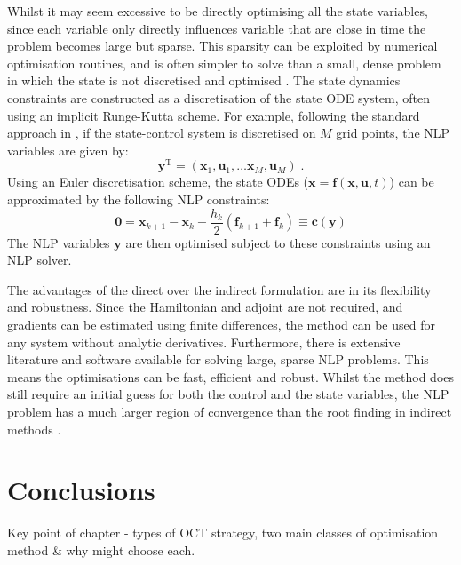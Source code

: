 Whilst it may seem excessive to be directly optimising all the state variables, since each variable only directly influences variable that are close in time the problem becomes large but sparse. This sparsity can be exploited by numerical optimisation routines, and is often simpler to solve than a small, dense problem in which the state is not discretised and optimised \citep{betts_practical_2010}. The state dynamics constraints are constructed as a discretisation of the state ODE system, often using an implicit Runge-Kutta scheme. For example, following the standard approach in \citet{betts_practical_2010}, if the state-control system is discretised on $M$ grid points, the NLP variables are given by:
\begin{equation}
    \bm{y}^\mathrm{T} = \left(\bm{x}_1, \bm{u}_1, \ldots \bm{x}_M, \bm{u}_M\right)\;.
\end{equation}
Using an Euler discretisation scheme, the state ODEs ($\dot{\bm{x}} = \bm{f}(\bm{x}, \bm{u}, t)$) can be approximated by the following NLP constraints:
\begin{equation}
    \bm{0} = \bm{x}_{k+1} - \bm{x}_k - \frac{h_k}{2}\left(\bm{f}_{k+1} + \bm{f}_k\right) \equiv \bm{c}(\bm{y})
\end{equation}
The NLP variables $\bm{y}$ are then optimised subject to these constraints using an NLP solver.

The advantages of the direct over the indirect formulation are in its flexibility and robustness. Since the Hamiltonian and adjoint are not required, and gradients can be estimated using finite differences, the method can be used for any system without analytic derivatives. Furthermore, there is extensive literature and software available for solving large, sparse NLP problems. This means the optimisations can be fast, efficient and robust. Whilst the method does still require an initial guess for both the control and the state variables, the NLP problem has a much larger region of convergence than the root finding in indirect methods \citep{betts_practical_2010}.

\section{Conclusions}

Key point of chapter - types of OCT strategy, two main classes of optimisation method \& why might choose each.